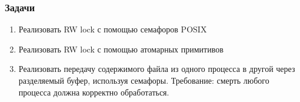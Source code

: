 \documentclass[aspectratio=169, pdf, 8pt, unicode]{beamer}
\begin{document}
\begin{frame}[fragile]
\frametitle{Задачи}
\begin{enumerate}
\item Реализовать RW lock с помощью семафоров POSIX
\item Реализовать RW lock с помощью атомарных примитивов
\item Реализовать передачу содержимого файла из одного процесса в другой через разделяемый буфер, используя семафоры. Требование: смерть любого процесса 
должна корректно обработаться.
\end{enumerate}
\end{frame}
\end{document}
